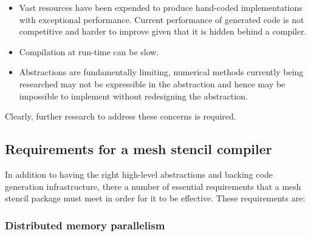 \documentclass[thesis]{subfiles}
\begin{document}
\begin{itemize}
  \item
    Vast resources have been expended to produce hand-coded implementations with exceptional performance.
    Current performance of generated code is not competitive and harder to improve given that it is hidden behind a compiler.
  \item
    Compilation at run-time can be slow.
  \item
    Abstractions are fundamentally limiting, numerical methods currently being researched may not be expressible in the abstraction and hence may be impossible to implement without redesigning the abstraction.
\end{itemize}

Clearly, further research to address these concerns is required.


\subsection{Requirements for a mesh stencil compiler}


In addition to having the right high-level abstractions and backing code generation infrastructure, there a number of essential requirements that a mesh stencil package must meet in order for it to be effective.
These requirements are:


\subsubsection{Distributed memory parallelism}
\label{sec:intro_parallelism}
\end{document}
